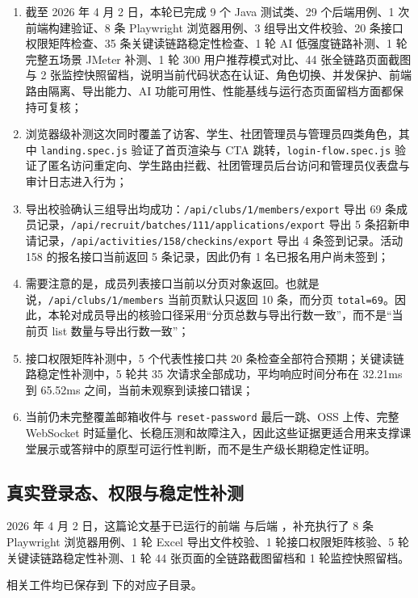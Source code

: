 \begin{enumerate}
  \item 截至 2026 年 4 月 2 日，本轮已完成 9 个 Java 测试类、29 个后端用例、1 次前端构建验证、8 条 Playwright 浏览器用例、3 组导出文件校验、20 条接口权限矩阵检查、35 条关键读链路稳定性检查、1 轮 AI 低强度链路补测、1 轮完整五场景 JMeter 补测、1 轮 300 用户推荐模式对比、44 张全链路页面截图与 2 张监控快照留档，说明当前代码状态在认证、角色切换、并发保护、前端路由隔离、导出能力、AI 功能可用性、性能基线与运行态页面留档方面都保持可复核；
  \item 浏览器级补测这次同时覆盖了访客、学生、社团管理员与管理员四类角色，其中 \texttt{landing.spec.js} 验证了首页渲染与 CTA 跳转，\texttt{login-flow.spec.js} 验证了匿名访问重定向、学生路由拦截、社团管理员后台访问和管理员仪表盘与审计日志进入行为；
  \item 导出校验确认三组导出均成功：\texttt{/api/clubs/1/members/export} 导出 69 条成员记录，\texttt{/api/recruit/batches/111/applications/export} 导出 5 条招新申请记录，\texttt{/api/activities/158/checkins/export} 导出 4 条签到记录。活动 158 的报名接口当前返回 5 条记录，因此仍有 1 名已报名用户尚未签到；
  \item 需要注意的是，成员列表接口当前以分页对象返回。也就是说，\texttt{/api/clubs/1/members} 当前页默认只返回 10 条，而分页 \texttt{total=69}。因此，本轮对成员导出的核验口径采用“分页总数与导出行数一致”，而不是“当前页 list 数量与导出行数一致”；
  \item 接口权限矩阵补测中，5 个代表性接口共 20 条检查全部符合预期；关键读链路稳定性补测中，5 轮共 35 次请求全部成功，平均响应时间分布在 32.21ms 到 65.52ms 之间，当前未观察到读接口错误；
  \item 当前仍未完整覆盖邮箱收件与 \texttt{reset-password} 最后一跳、OSS 上传、完整 WebSocket 时延量化、长稳压测和故障注入，因此这些证据更适合用来支撑课堂展示或答辩中的原型可运行性判断，而不是生产级长期稳定性证明。
\end{enumerate}

\subsection{真实登录态、权限与稳定性补测}

2026 年 4 月 2 日，这篇论文基于已运行的前端  与后端 ，补充执行了 8 条 Playwright 浏览器用例、1 轮 Excel 导出文件校验、1 轮接口权限矩阵核验、5 轮关键读链路稳定性补测、1 轮 44 张页面的全链路截图留档和 1 轮监控快照留档。

相关工件均已保存到  下的对应子目录。

